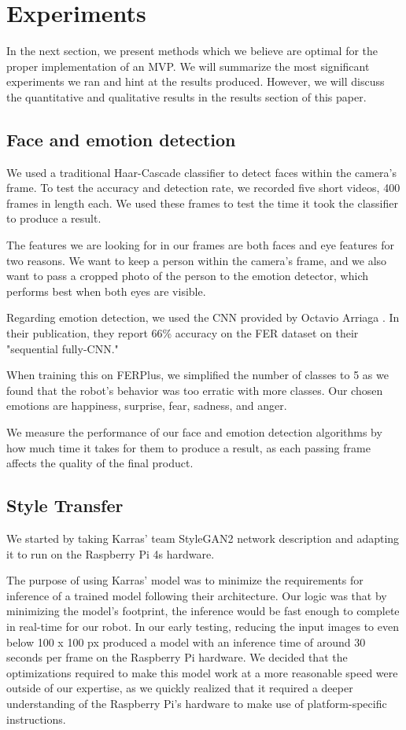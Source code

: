 \section{Experiments}

In the next section, we present methods which we believe are optimal for the proper implementation of an MVP. We will summarize the most significant experiments we ran and hint at the results produced. However, we will discuss the quantitative and qualitative results in the results section of this paper.


\subsection{Face and emotion detection}

We used a traditional Haar-Cascade classifier to detect faces within the camera's frame. To test the accuracy and detection rate, we recorded five short videos, 400 frames in length each. We used these frames to test the time it took the classifier to produce a result.

The features we are looking for in our frames are both faces and eye features for two reasons. We want to keep a person within the camera's frame, and we also want to pass a cropped photo of the person to the emotion detector, which performs best when both eyes are visible. 

Regarding emotion detection, we used the CNN provided by Octavio Arriaga \cite{DBLP:journals/corr/abs-1710-07557}. In their publication, they report 66\% accuracy on the FER dataset on their "sequential fully-CNN."

When training this on FERPlus, we simplified the number of classes to 5 as we found that the robot's behavior was too erratic with more classes. Our chosen emotions are happiness, surprise, fear, sadness, and anger.


We measure the performance of our face and emotion detection algorithms by how much time it takes for them to produce a result, as each passing frame affects the quality of the final product.

\subsection{Style Transfer}


We started by taking Karras' team StyleGAN2 network description and adapting it to run on the Raspberry Pi 4s hardware. 


The purpose of using Karras' model was to minimize the requirements for inference of a trained model following their architecture. Our logic was that by minimizing the model's footprint, the inference would be fast enough to complete in real-time for our robot. In our early testing, reducing the input images to even below 100 x 100 px produced a model with an inference time of around 30 seconds per frame on the Raspberry Pi hardware. We decided that the optimizations required to make this model work at a more reasonable speed were outside of our expertise, as we quickly realized that it required a deeper understanding of the Raspberry Pi's hardware to make use of platform-specific instructions. 

